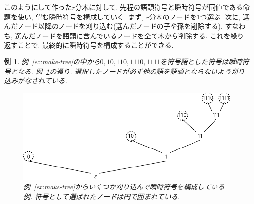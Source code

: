 \documentclass[12pt]{ltjsarticle}
\newcommand*{\exref}[1]{例~\ref{#1}}
\newcommand*{\fgref}[1]{図~\ref{#1}}
\newtheorem{example}{例}
\begin{document}
このようにして作った$r$分木に対して, 先程の語頭符号と瞬時符号が同値である命題を使い,
望む瞬時符号を構成していく.
まず, $r$分木のノードを1つ選ぶ.
次に, 選んだノード以降のノードを刈り込む(選んだノードの子や孫を削除する).
すなわち, 選んだノードを語頭に含んでいるノードを全て木から削除する.
これを繰り返すことで, 最終的に瞬時符号を構成することができる.
\begin{example}
  \exref{ex:make-tree}の中から$0, 10, 110, 1110, 1111$を符号語とした符号は瞬時符号となる.
  \fgref{fg:processed-r-ary-tree}の通り,
  選択したノードが必ず他の語を語頭とならないよう刈り込みがなされている.
  \begin{figure}
    \centering
    \includegraphics{image/構成された瞬時符号.pdf}
    \caption{\exref{ex:make-tree}からいくつか刈り込んで瞬時符号を構成している例. 符号として選ばれたノードは円で囲まれている.}
    \label{fg:processed-r-ary-tree}
  \end{figure}
\end{example}
\end{document}
